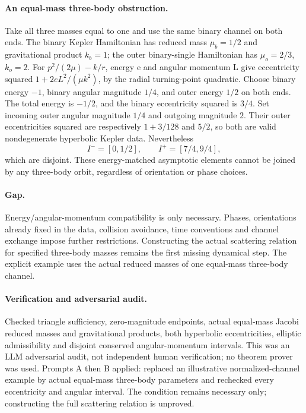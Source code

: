 \documentclass[11pt]{article}
\begin{document}
\paragraph{An equal-mass three-body obstruction.}Take all three masses equal to one and use the same binary channel on both ends. The binary Kepler Hamiltonian has reduced mass \(\mu_b=1/2\) and gravitational product \(k_b=1\); the outer binary-single Hamiltonian has \(\mu_o=2/3\), \(k_o=2\). For \(p^2/(2\mu)-k/r\), energy e and angular momentum L give eccentricity squared \(1+2eL^2/(\mu k^2)\), by the radial turning-point quadratic. Choose binary energy \(-1\), binary angular magnitude \(1/4\), and outer energy \(1/2\) on both ends. The total energy is \(-1/2\), and the binary eccentricity squared is \(3/4\). Set incoming outer angular magnitude \(1/4\) and outgoing magnitude \(2\). Their outer eccentricities squared are respectively \(1+3/128\) and \(5/2\), so both are valid nondegenerate hyperbolic Kepler data. Nevertheless
\[I^-=[0,1/2],\qquad I^+=[7/4,9/4],\]
which are disjoint. These energy-matched asymptotic elements cannot be joined by any three-body orbit, regardless of orientation or phase choices.
\paragraph{Gap.}Energy/angular-momentum compatibility is only necessary. Phases, orientations already fixed in the data, collision avoidance, time conventions and channel exchange impose further restrictions. Constructing the actual scattering relation for specified three-body masses remains the first missing dynamical step. The explicit example uses the actual reduced masses of one equal-mass three-body channel.

\paragraph{Verification and adversarial audit.}
Checked triangle sufficiency, zero-magnitude endpoints, actual equal-mass Jacobi reduced masses and gravitational products, both hyperbolic eccentricities, elliptic admissibility and disjoint conserved angular-momentum intervals. This was an LLM adversarial audit, not independent human verification; no theorem prover was used. Prompts A then B applied: replaced an illustrative normalized-channel example by actual equal-mass three-body parameters and rechecked every eccentricity and angular interval. The condition remains necessary only; constructing the full scattering relation is unproved.
\end{document}
